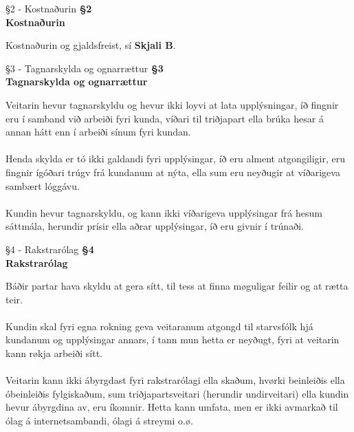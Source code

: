 \begin{center}
	 {§2 - Kostnaðurin}
	\textbf{§2 \\ Kostnaðurin}
\end{center}
Kostnaðurin og gjaldsfreist, sí \textbf{Skjali B}.

\begin{center}
	 {§3 - Tagnarskylda og ognarrættur}
	\textbf{§3 \\ Tagnarskylda og ognarrættur}
\end{center}
Veitarin hevur tagnarskyldu og hevur ikki loyvi at lata upplýsningar, íð fingnir eru í samband við arbeiði fyri kunda, víðari til triðjapart ella brúka hesar á annan hátt enn í arbeiði sínum fyri kundan. \\ \\
Henda skylda er tó ikki galdandi fyri upplýsingar, íð eru alment atgongiligir, eru fingnir ígóðari trúgv frá kundanum at nýta, ella sum eru neyðugir at víðarigeva sambært lóggávu. \\ \\
Kundin hevur tagnarskyldu, og kann ikki víðarigeva upplýsingar frá hesum sáttmála, herundir prísir ella aðrar upplýsingar, íð eru givnir í trúnaði.

\begin{center}
	 {§4 - Rakstrarólag}
	\textbf{§4 \\ Rakstrarólag}
\end{center}
Báðir partar hava skyldu at gera sítt, til tess at finna møguligar feilir og at rætta teir. \\ \\
Kundin skal fyri egna rokning geva veitaranum atgongd til starvsfólk hjá kundanum og upplýsingar annars, í tann mun hetta er neyðugt, fyri at veitarin kann røkja arbeiði sítt. \\ \\
Veitarin kann ikki ábyrgdast fyri rakstrarólagi ella skaðum, hvørki beinleiðis ella óbeinleiðis fylgiskaðum, sum triðjapartsveitari (herundir undirveitari) ella kundin hevur ábyrgdina av, eru íkomnir. Hetta kann umfata, men er ikki avmarkað til ólag á internetsambandi, ólagi á streymi o.ø.

